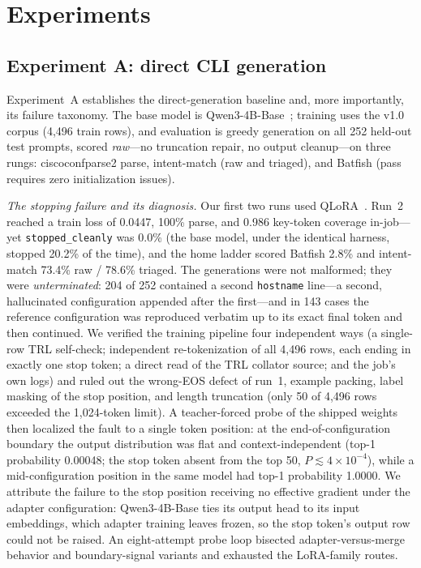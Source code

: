 \documentclass[conference]{IEEEtran}
\begin{document}
\section{Experiments}
\label{sec:experiments}

\subsection{Experiment A: direct CLI generation}
\label{sec:expa}

Experiment~A establishes the direct-generation baseline and, more importantly, its failure taxonomy. The base model is Qwen3-4B-Base~\cite{qwen3techreport}; training uses the v1.0 corpus (4,496 train rows), and evaluation is greedy generation on all 252 held-out test prompts, scored \emph{raw}---no truncation repair, no output cleanup---on three rungs: ciscoconfparse2 parse, intent-match (raw and triaged), and Batfish (pass requires zero initialization issues).

\emph{The stopping failure and its diagnosis.} Our first two runs used QLoRA~\cite{hu2022lora,dettmers2023qlora}. Run~2 reached a train loss of 0.0447, 100\% parse, and 0.986 key-token coverage in-job---yet \texttt{stopped\_cleanly} was 0.0\% (the base model, under the identical harness, stopped 20.2\% of the time), and the home ladder scored Batfish 2.8\% and intent-match 73.4\% raw / 78.6\% triaged. The generations were not malformed; they were \emph{unterminated}: 204 of 252 contained a second \texttt{hostname} line---a second, hallucinated configuration appended after the first---and in 143 cases the reference configuration was reproduced verbatim up to its exact final token and then continued. We verified the training pipeline four independent ways (a single-row TRL self-check; independent re-tokenization of all 4,496 rows, each ending in exactly one stop token; a direct read of the TRL collator source; and the job's own logs) and ruled out the wrong-EOS defect of run~1, example packing, label masking of the stop position, and length truncation (only 50 of 4,496 rows exceeded the 1,024-token limit). A teacher-forced probe of the shipped weights then localized the fault to a single token position: at the end-of-configuration boundary the output distribution was flat and context-independent (top-1 probability 0.00048; the stop token absent from the top 50, $P \lesssim 4\times10^{-4}$), while a mid-configuration position in the same model had top-1 probability 1.0000. We attribute the failure to the stop position receiving no effective gradient under the adapter configuration: Qwen3-4B-Base ties its output head to its input embeddings, which adapter training leaves frozen, so the stop token's output row could not be raised. An eight-attempt probe loop bisected adapter-versus-merge behavior and boundary-signal variants and exhausted the LoRA-family routes.
\end{document}
